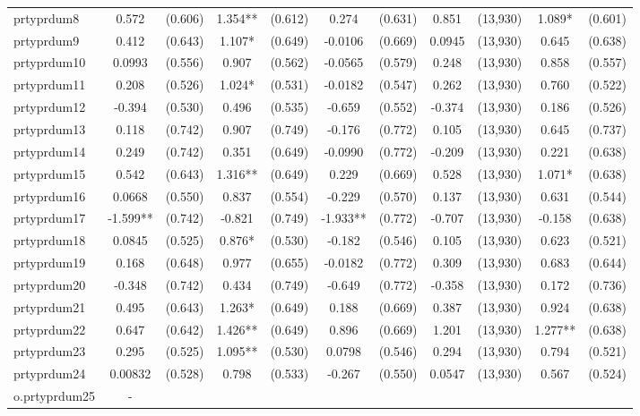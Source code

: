 \documentclass[]{article}
\begin{document}
\begin{tabular}{lcccccccccc}
prtyprdum8 & 0.572 & (0.606) & 1.354** & (0.612) & 0.274 & (0.631) & 0.851 & (13,930) & 1.089* & (0.601) \\
prtyprdum9 & 0.412 & (0.643) & 1.107* & (0.649) & -0.0106 & (0.669) & 0.0945 & (13,930) & 0.645 & (0.638) \\
prtyprdum10 & 0.0993 & (0.556) & 0.907 & (0.562) & -0.0565 & (0.579) & 0.248 & (13,930) & 0.858 & (0.557) \\
prtyprdum11 & 0.208 & (0.526) & 1.024* & (0.531) & -0.0182 & (0.547) & 0.262 & (13,930) & 0.760 & (0.522) \\
prtyprdum12 & -0.394 & (0.530) & 0.496 & (0.535) & -0.659 & (0.552) & -0.374 & (13,930) & 0.186 & (0.526) \\
prtyprdum13 & 0.118 & (0.742) & 0.907 & (0.749) & -0.176 & (0.772) & 0.105 & (13,930) & 0.645 & (0.737) \\
prtyprdum14 & 0.249 & (0.742) & 0.351 & (0.649) & -0.0990 & (0.772) & -0.209 & (13,930) & 0.221 & (0.638) \\
prtyprdum15 & 0.542 & (0.643) & 1.316** & (0.649) & 0.229 & (0.669) & 0.528 & (13,930) & 1.071* & (0.638) \\
prtyprdum16 & 0.0668 & (0.550) & 0.837 & (0.554) & -0.229 & (0.570) & 0.137 & (13,930) & 0.631 & (0.544) \\
prtyprdum17 & -1.599** & (0.742) & -0.821 & (0.749) & -1.933** & (0.772) & -0.707 & (13,930) & -0.158 & (0.638) \\
prtyprdum18 & 0.0845 & (0.525) & 0.876* & (0.530) & -0.182 & (0.546) & 0.105 & (13,930) & 0.623 & (0.521) \\
prtyprdum19 & 0.168 & (0.648) & 0.977 & (0.655) & -0.0182 & (0.772) & 0.309 & (13,930) & 0.683 & (0.644) \\
prtyprdum20 & -0.348 & (0.742) & 0.434 & (0.749) & -0.649 & (0.772) & -0.358 & (13,930) & 0.172 & (0.736) \\
prtyprdum21 & 0.495 & (0.643) & 1.263* & (0.649) & 0.188 & (0.669) & 0.387 & (13,930) & 0.924 & (0.638) \\
prtyprdum22 & 0.647 & (0.642) & 1.426** & (0.649) & 0.896 & (0.669) & 1.201 & (13,930) & 1.277** & (0.638) \\
prtyprdum23 & 0.295 & (0.525) & 1.095** & (0.530) & 0.0798 & (0.546) & 0.294 & (13,930) & 0.794 & (0.521) \\
prtyprdum24 & 0.00832 & (0.528) & 0.798 & (0.533) & -0.267 & (0.550) & 0.0547 & (13,930) & 0.567 & (0.524) \\
o.prtyprdum25 & - &  &  &  &  &  &  &  &  &  \\

\end{tabular}
\end{document}
